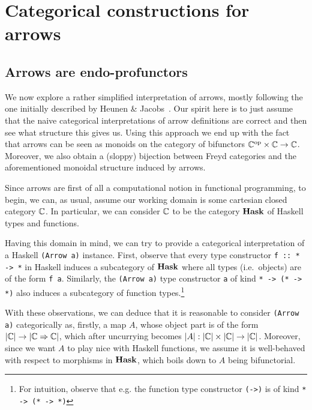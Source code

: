\section{Categorical constructions for arrows}

\subsection{Arrows are endo-profunctors}


We now explore a rather simplified interpretation of arrows, mostly following
the one initially described by Heunen \& Jacobs~\cite{arr-like-mon}. Our spirit
here is to just assume that the naive categorical interpretations of arrow
definitions are correct and then see what structure this gives us.
Using this approach we end up with the fact that arrows can be seen as monoids
on the category of bifunctors ${\mathbb{C}}^{\text{op}} \times \mathbb{C} \to \mathbb{C}$.
Moreover, we also obtain a (sloppy) bijection between Freyd categories and
the aforementioned monoidal structure induced by arrows.

Since arrows are first of all a computational notion in functional programming,
to begin, we can, as usual, assume our working domain is some cartesian closed
category $\mathbb{C}$. In particular, we can consider $\mathbb{C}$ to be the category
$\mathbf{Hask}$ of Haskell types and functions.

Having this domain in mind, we can try to provide a categorical interpretation
of a Haskell \verb|(Arrow a)| instance. First, observe that every type
constructor \verb|f :: * -> *| in Haskell induces a subcategory of $\mathbf{Hask}$
where all types (i.e.~objects) are of the form \verb|f a|.  Similarly,
the \verb|(Arrow a)| type constructor \verb|a| of kind \verb|* -> (* -> *)|
also induces a subcategory of function types.\footnote{%
For intuition, observe that e.g. the function type constructor
\texttt{(->)} is of kind \texttt{* -> (* -> *)}}

With these observations, we can deduce that it is reasonable to consider
\verb|(Arrow a)| categorically as, firstly, a map $A$, whose object part is
of the form $|\mathbb{C}| \to |\mathbb{C} \Rightarrow \mathbb{C}|$, which after uncurrying
becomes $|A|: |\mathbb{C}| \times |\mathbb{C}| \to |\mathbb{C}|$. Moreover, since we want $A$
to play nice with Haskell functions, we assume it is well-behaved with respect
to morphisms in $\mathbf{Hask}$, which boils down to $A$ being bifunctorial.

